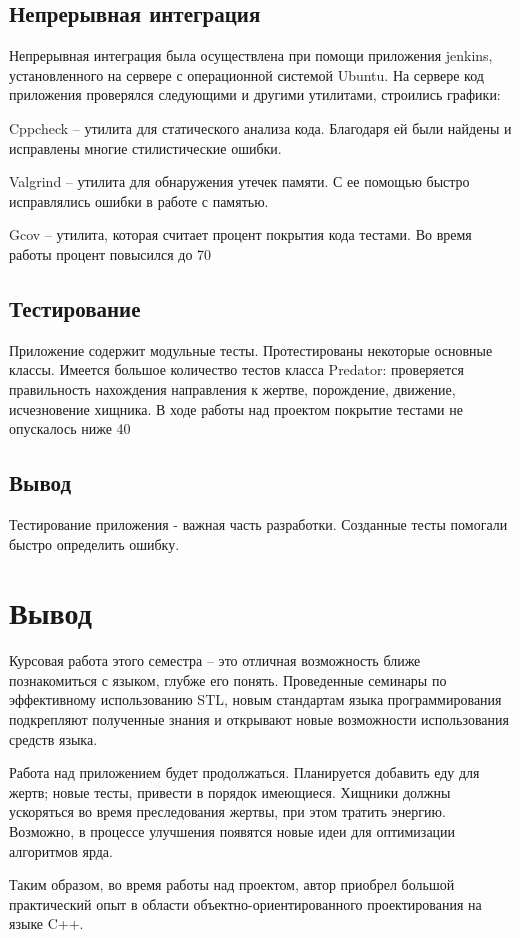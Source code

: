 \documentclass[a4paper]{article}
\begin{document}
\subsection{Непрерывная интеграция}
Непрерывная интеграция была осуществлена при помощи приложения jenkins, установленного на сервере с операционной системой Ubuntu. На сервере код приложения проверялся следующими и другими утилитами, строились графики: 

Cppcheck – утилита для статического анализа кода. Благодаря ей были найдены и исправлены многие стилистические ошибки. 

Valgrind – утилита для обнаружения утечек памяти. С ее помощью быстро исправлялись ошибки в работе с памятью.

Gcov – утилита, которая считает процент покрытия кода тестами. Во время работы процент повысился до 70%
\subsection{Тестирование}
Приложение содержит модульные тесты. Протестированы некоторые основные классы. Имеется большое количество тестов класса Predator: проверяется правильность нахождения направления к жертве, порождение, движение, исчезновение хищника. В ходе работы над проектом покрытие тестами не опускалось ниже 40%

\subsection{Вывод}
Тестирование приложения - важная часть разработки. Созданные тесты помогали быстро определить ошибку.
\section{Вывод}
Курсовая работа этого семестра – это отличная возможность ближе познакомиться с языком, глубже его понять. Проведенные семинары по эффективному использованию STL, новым стандартам языка программирования подкрепляют полученные знания и открывают новые возможности использования средств языка. 

Работа над приложением будет продолжаться. Планируется добавить еду для жертв;  новые тесты, привести в порядок имеющиеся. Хищники должны ускоряться во время преследования жертвы, при этом тратить энергию. Возможно, в процессе улучшения появятся новые идеи для оптимизации алгоритмов ярда. 

Таким образом, во время работы над проектом, автор приобрел большой практический опыт в области объектно-ориентированного проектирования на языке C++. 
\end{document}

